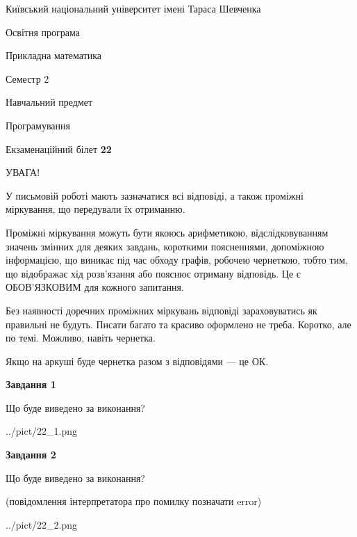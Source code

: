 \documentclass[12pt, ukrainian]{article}
\begin{document}
{{\begin {small}\par
{ \center  Київський національний університет імені Тараса Шевченка \par}
{\parbox {5 cm}{Освітня програма \hfill}{\parbox {7 cm}{Прикладна математика\hfill}}\parbox {6 cm}{\hfill Семестр 2}}\par
{\parbox {5 cm} {Навчальний предмет \hfill}\parbox {7 cm}{Програмування \hfill}\parbox {6cm}{\hfill}\par}\vspace{-7pt} \end{small}}{\center Екзаменаційний білет \No \textbf
{ 22 }\par}}
{
\begin {large}
УВАГА!

У письмовій роботі мають зазначатися всі відповіді, а також проміжні міркування, що передували їх отриманню.

Проміжні міркування можуть бути якоюсь арифметикою, відслідковуванням зна\-чень змінних для деяких завдань,
короткими поясненнями, допоміжною інформацією, що виникає під час обходу графів, робочею чернеткою,
тобто тим, що відображає хід розв’язання або пояснює отриману відповідь.
Це є ОБОВ’ЯЗКОВИМ для кожного запитання.

Без наявності доречних проміжних міркувань відповіді зараховуватись як правиль\-ні не будуть.
Писати багато та красиво оформлено не треба. Коротко, але по темі. Можли\-во, навіть чернетка.

Якщо на аркуші буде чернетка разом з відповідями --- це ОК.

\newpage

{\begin {center}\textbf{Завдання 1}\end {center}}\par
Що буде виведено за виконання?\par
\begin{center}
	{../pict/22_1.png}
\end{center}
\newpage

{\begin {center}\textbf{Завдання 2}\end {center}}\par
Що буде виведено за виконання?\par
 (повідомлення інтерпретатора про помилку позначати error)\par
\begin{center}
	{../pict/22_2.png}
\end{center}
\newpage


\end{large}}
\end{document}
